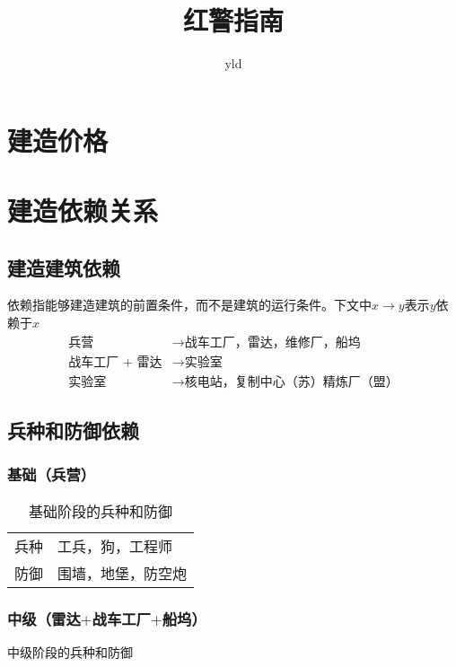 \documentclass[12pt]{ctexart}
\title{红警指南}
\author{yld}
\date{}
\begin{document}
	\maketitle
	\newpage
	\tableofcontents
	\newpage
	
	\section{建造价格}
		
	\newpage
	
	\section{建造依赖关系}
		\subsection{建造建筑依赖}
			依赖指能够建造建筑的前置条件，而不是建筑的运行条件。下文中$x \rightarrow y$表示$y$依赖于$x$
			\begin{align*}
				\text{兵营} &\rightarrow \text{战车工厂，雷达，维修厂，船坞}\\
				\text{战车工厂 + 雷达} &\rightarrow \text{实验室}\\
				\text{实验室} &\rightarrow \text{核电站，复制中心（苏）精炼厂（盟）}
			\end{align*}
			
		\subsection{兵种和防御依赖}
			\subsubsection{基础（兵营）}
			\begin{table}[h]
				\begin{center}
					\begin{tabular}{l|l}
						\toprule
						兵种 & 工兵，狗，工程师\\
						防御 & 围墙，地堡，防空炮\\
						\bottomrule
					\end{tabular}
					\label{tab:表1}
					\caption{基础阶段的兵种和防御}
				\end{center}
			\end{table}
			
			\subsubsection{中级（雷达$+$战车工厂$+$船坞）}
			\begin{table}[h]
				\begin{center}
					\label{tab:表2}
					\caption{中级阶段的兵种和防御}
				\end{center}
			\end{table}
			
\end{document}
